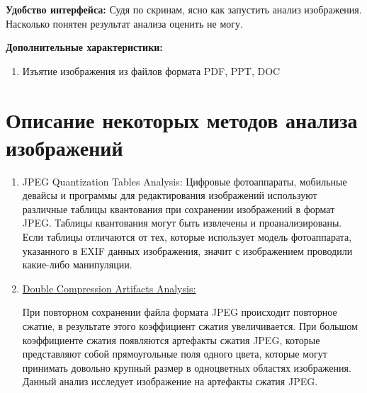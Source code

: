 \textbf{Удобство интерфейса:}
Судя по скринам, ясно как запустить анализ изображения. Насколько понятен результат анализа оценить не могу.
  
\textbf{Дополнительные характеристики:}
\begin{enumerate}
  \item Изъятие изображения из файлов формата PDF, PPT, DOC 
\end{enumerate}

\newpage
\section{Описание некоторых методов анализа изображений}
\begin{enumerate}
  \item JPEG Quantization Tables Analysis:
Цифровые фотоаппараты, мобильные девайсы и программы для редактирования
изображений используют различные таблицы квантования при сохранении изображений в
формат JPEG. Таблицы квантования могут быть извлечены и проанализированы. Если
таблицы отличаются от тех, которые использует модель фотоаппарата, указанного в EXIF
данных изображения, значит с изображением проводили какие-либо манипуляции.
  \label{itm:DCAA}
  \item \hypertarget{itm:DCAA}{\hyperlink{itm:DCAB}{Double Compression Artifacts Analysis:}} 
При повторном сохранении файла формата JPEG происходит повторное сжатие, в
результате этого коэффициент сжатия увеличивается. При большом коэффициенте
сжатия появляются артефакты сжатия JPEG, которые представляют собой
прямоугольные поля одного цвета, которые могут принимать довольно крупный размер в
одноцветных областях изображения. Данный анализ исследует изображение на
артефакты сжатия JPEG.
\end{enumerate}